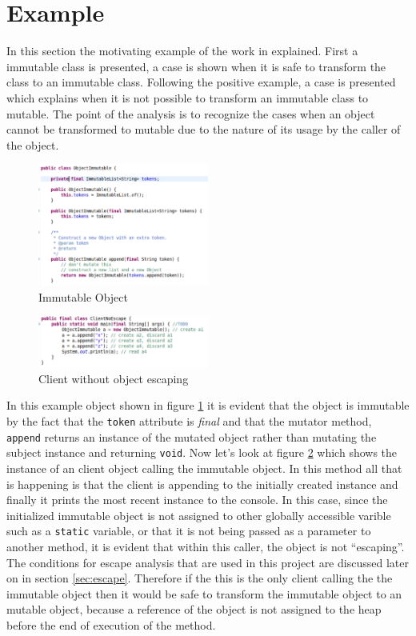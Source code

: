 \section{Example}
In this section the motivating example of the work in explained. First a immutable class is presented, a case is shown when it is safe to transform the class to an immutable class. Following the positive example, a case is presented which explains when it is not possible to transform an immutable class to mutable. The point of the analysis is to recognize the cases when an object cannot be transformed to mutable due to the nature of its usage by the caller of the object.

\begin{figure}[H]
	\caption{Immutable Object} \label{fig:immutable_object}
	\includegraphics[width=0.5\textwidth]{img/immutable_object}
\end{figure}

\begin{figure}[H]
	\caption{Client without object escaping} \label{fig:clientNoEscape}
	\includegraphics[width=0.5\textwidth]{img/client_noescape}
\end{figure}

In this example object shown in figure \ref{fig:immutable_object} it is evident that the object is immutable by the fact that the \texttt{token} attribute is \textit{final} and that the mutator method, \texttt{append\(\)} returns an instance of the mutated object rather than mutating the subject instance and returning \texttt{void}. Now let's look at figure \ref{fig:clientNoEscape} which shows the instance of an client object calling the immutable object. In this method all that is happening is that the client is appending to the initially created instance and finally it prints the most recent instance to the console. In this case, since the initialized immutable object is not assigned to other globally accessible varible such as a \texttt{static} variable, or that it is not being passed as a parameter to another method, it is evident that within this caller, the object is not ``escaping''. The conditions for escape analysis that are used in this project are discussed later on in section \ref{sec:escape}.
Therefore if the this is the only client calling the the immutable object then it would be safe to transform the immutable object to an mutable object, because a reference of the object is not assigned to the heap before the end of execution of the method.

